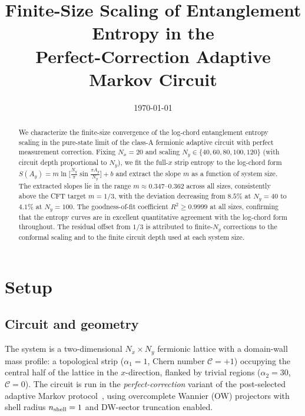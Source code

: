 \documentclass[aps,prb,twocolumn,showpacs,floatfix]{revtex4-2}
\newcommand{\Ny}{N_y}
\newcommand{\Nx}{N_x}
\newcommand{\nshell}{n_{\rm shell}}
\begin{document}
\title{Finite-Size Scaling of Entanglement Entropy in the\\
Perfect-Correction Adaptive Markov Circuit}

\date{\today}

\begin{abstract}
We characterize the finite-size convergence of the log-chord entanglement entropy
scaling in the pure-state limit of the class-A fermionic adaptive circuit with perfect
measurement correction.
Fixing $\Nx = 20$ and scaling $\Ny \in \{40, 60, 80, 100, 120\}$ (with circuit depth
proportional to $\Ny$), we fit the full-$x$ strip entropy to the log-chord form
$S(A_y) = m\ln\!\bigl[\frac{\Ny}{\pi}\sin\frac{\pi A_y}{\Ny}\bigr] + b$
and extract the slope $m$ as a function of system size.
The extracted slopes lie in the range $m \approx 0.347$--$0.362$ across all sizes,
consistently above the CFT target $m = 1/3$, with the deviation decreasing from
$8.5\%$ at $\Ny = 40$ to $4.1\%$ at $\Ny = 100$.
The goodness-of-fit coefficient $R^2 \geq 0.9999$ at all sizes, confirming that the
entropy curves are in excellent quantitative agreement with the log-chord form
throughout.
The residual offset from $1/3$ is attributed to finite-$\Ny$ corrections to the
conformal scaling and to the finite circuit depth used at each system size.
\end{abstract}

\maketitle

\section{Setup}
\label{sec:setup}

\subsection{Circuit and geometry}

The system is a two-dimensional $\Nx \times \Ny$ fermionic lattice with a
domain-wall mass profile:
a topological strip ($\alpha_1 = 1$, Chern number $\mathcal{C} = +1$) occupying
the central half of the lattice in the $x$-direction, flanked by trivial regions
($\alpha_2 = 30$, $\mathcal{C} = 0$).
The circuit is run in the \emph{perfect-correction} variant of the post-selected
adaptive Markov protocol~\cite{classA_paper}, using overcomplete Wannier (OW)
projectors with shell radius $\nshell = 1$ and DW-sector truncation enabled.
\end{document}
